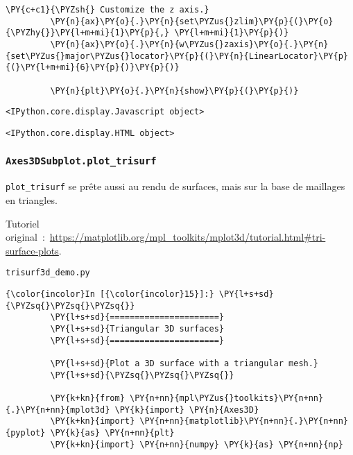 \begin{Verbatim}[commandchars=\\\{\},frame=single,framerule=0.3mm,rulecolor=\color{cellframecolor}]
         \PY{c+c1}{\PYZsh{} Customize the z axis.}
         \PY{n}{ax}\PY{o}{.}\PY{n}{set\PYZus{}zlim}\PY{p}{(}\PY{o}{\PYZhy{}}\PY{l+m+mi}{1}\PY{p}{,} \PY{l+m+mi}{1}\PY{p}{)}
         \PY{n}{ax}\PY{o}{.}\PY{n}{w\PYZus{}zaxis}\PY{o}{.}\PY{n}{set\PYZus{}major\PYZus{}locator}\PY{p}{(}\PY{n}{LinearLocator}\PY{p}{(}\PY{l+m+mi}{6}\PY{p}{)}\PY{p}{)}
         
         \PY{n}{plt}\PY{o}{.}\PY{n}{show}\PY{p}{(}\PY{p}{)}
\end{Verbatim}


    
    \begin{verbatim}
<IPython.core.display.Javascript object>
    \end{verbatim}

    
    
    \begin{verbatim}
<IPython.core.display.HTML object>
    \end{verbatim}

    
    \hypertarget{axes3dsubplot.plot_trisurf}{%
\subsubsection{\texorpdfstring{\texttt{Axes3DSubplot.plot\_trisurf}}{Axes3DSubplot.plot\_trisurf}}\label{axes3dsubplot.plot_trisurf}}

    \texttt{plot\_trisurf} se prête aussi au rendu de surfaces, mais sur la
base de maillages en triangles.

    Tutoriel
original~:~\url{https://matplotlib.org/mpl_toolkits/mplot3d/tutorial.html\#tri-surface-plots}.

    \texttt{trisurf3d\_demo.py}

    \begin{Verbatim}[commandchars=\\\{\},frame=single,framerule=0.3mm,rulecolor=\color{cellframecolor}]
{\color{incolor}In [{\color{incolor}15}]:} \PY{l+s+sd}{\PYZsq{}\PYZsq{}\PYZsq{}}
         \PY{l+s+sd}{======================}
         \PY{l+s+sd}{Triangular 3D surfaces}
         \PY{l+s+sd}{======================}
         
         \PY{l+s+sd}{Plot a 3D surface with a triangular mesh.}
         \PY{l+s+sd}{\PYZsq{}\PYZsq{}\PYZsq{}}
         
         \PY{k+kn}{from} \PY{n+nn}{mpl\PYZus{}toolkits}\PY{n+nn}{.}\PY{n+nn}{mplot3d} \PY{k}{import} \PY{n}{Axes3D}
         \PY{k+kn}{import} \PY{n+nn}{matplotlib}\PY{n+nn}{.}\PY{n+nn}{pyplot} \PY{k}{as} \PY{n+nn}{plt}
         \PY{k+kn}{import} \PY{n+nn}{numpy} \PY{k}{as} \PY{n+nn}{np}
\end{Verbatim}


